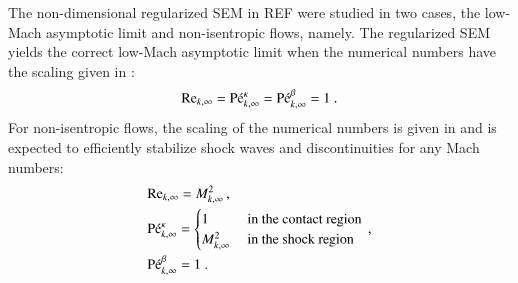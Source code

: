 \documentclass[preprint,10pt]{elsarticle}
\begin{document}
The non-dimensional regularized SEM in REF were studied in two cases, the low-Mach asymptotic limit and non-isentropic flows, namely. The regularized SEM yields the correct low-Mach asymptotic limit when the numerical numbers have the scaling given in :
%
\begin{equation}\label{eq:isent-flow-num-nb}
\Re_{k,\infty} = \Pe_{k,\infty}^\kappa = \Pe_{k,\infty}^\beta =1 \ .
\end{equation}
%
For non-isentropic flows, the scaling of the numerical numbers is given in  and is expected to efficiently stabilize shock waves and discontinuities for any Mach numbers:
%
\begin{align}\label{eq:non-isent-flow-num-nb}
&\textrm{Re}_{k,\infty} = M_{k,\infty}^2 \,, \nonumber \\ 
& \textrm{P\'e}_{k,\infty}^\kappa = 
\begin{cases} 
1              & \text{ in the contact region} \\
M^2_{k,\infty} & \text{ in the shock region } 
\end{cases} \,, \\ 
&\textrm{P\'e}_{k,\infty}^\beta = 1 \ . \nonumber
\end{align}
%
%
\end{document}
